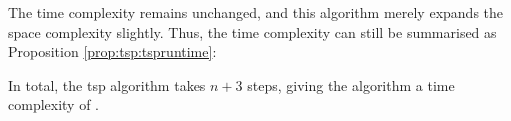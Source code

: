 The time complexity remains unchanged, and this algorithm merely expands the space complexity slightly.  Thus, the time complexity can still be summarised as Proposition \ref{prop:tsp:tspruntime}:

\begin{proposition}
In total, the \gls{tsp} algorithm takes \(n + 3\) steps, giving the algorithm a time complexity of .
\label{prop:tsp:tspruntime}
\end{proposition}